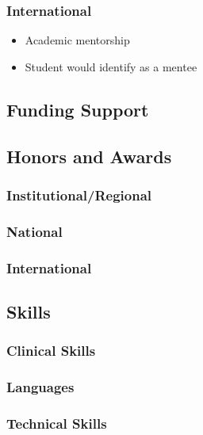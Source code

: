 \documentclass[
  16,
]{article}
\providecommand{\tightlist}{%
  \setlength{\itemsep}{0pt}\setlength{\parskip}{0pt}}\usepackage{longtable,booktabs,array}
\begin{document}
\subsubsection{International}\label{international}

\begin{itemize}
\tightlist
\item
  Academic mentorship
\item
  Student would identify as a mentee
\end{itemize}

\subsection{Funding Support}\label{funding-support}

\subsection{Honors and Awards}\label{honors-and-awards}

\subsubsection{Institutional/Regional}\label{institutionalregional}

\subsubsection{National}\label{national-1}

\subsubsection{International}\label{international-1}

\subsection{Skills}\label{skills}

\subsubsection{Clinical Skills}\label{clinical-skills}

\subsubsection{Languages}\label{languages}

\subsubsection{Technical Skills}\label{technical-skills}
\end{document}
